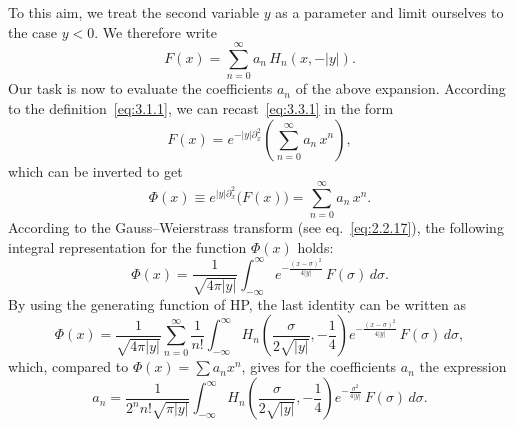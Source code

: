 To this aim, we treat the second variable $y$ as a parameter and
limit ourselves to the case $y<0$. We therefore write
\begin{equation}
F(x)=\sum_{n=0}^{\infty}a_n\,H_n(x,-|y|).
\label{eq:3.3.1}
\end{equation}
Our task is now to evaluate the coefficients $a_n$ of the above
expansion. According to the definition~\eqref{eq:3.1.1}, we can
recast~\eqref{eq:3.3.1} in the form
\[
F(x)=e^{-|y|\partial_x^2}\!\left(\sum_{n=0}^{\infty}a_n\,x^n\right),
\]
which can be inverted to get
\[
\Phi(x)\equiv e^{|y|\partial_x^2}\!\bigl(F(x)\bigr)
=\sum_{n=0}^{\infty}a_n\,x^n.
\]
According to the Gauss--Weierstrass transform (see
eq.~\eqref{eq:2.2.17}), the following integral representation for
the function $\Phi(x)$ holds:
\begin{equation}
\Phi(x)=\frac{1}{\sqrt{4\pi|y|}}\int_{-\infty}^{\infty}
e^{-\frac{(x-\sigma)^2}{4|y|}}\,F(\sigma)\,d\sigma.
\label{eq:3.3.4}
\end{equation}
By using the generating function of HP, the last identity can be
written as
\[
\Phi(x)=\frac{1}{\sqrt{4\pi|y|}}
 \sum_{n=0}^{\infty}\frac{1}{n!}
 \int_{-\infty}^{\infty}
 H_n\!\left(\frac{\sigma}{2\sqrt{|y|}},-\frac{1}{4}\right)
 e^{-\frac{(x-\sigma)^2}{4|y|}}\,F(\sigma)\,d\sigma,
\]
which, compared to $\Phi(x)=\sum a_n x^n$, gives for the
coefficients $a_n$ the expression
\begin{equation}
a_n=\frac{1}{2^n n!\sqrt{\pi|y|}}
\int_{-\infty}^{\infty}
H_n\!\left(\frac{\sigma}{2\sqrt{|y|}},-\frac{1}{4}\right)
e^{-\frac{\sigma^2}{4|y|}}\,F(\sigma)\,d\sigma.
\label{eq:3.3.6}
\end{equation}

